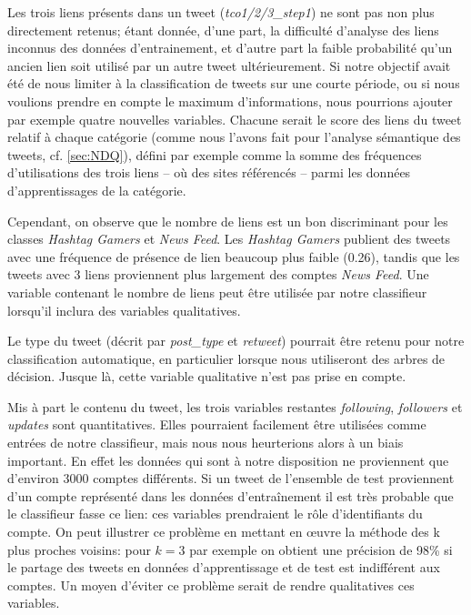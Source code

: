 \documentclass[twocolumn,10pt]{article}
\begin{document}
Les trois liens présents dans un tweet (\textit{tco1/2/3\_step1}) ne sont pas non plus directement retenus; étant donnée, d'une part, la difficulté d'analyse des liens inconnus des données d'entrainement, et d'autre part la faible probabilité qu'un ancien lien soit utilisé par un autre tweet ultérieurement. Si notre objectif avait été de nous limiter à la classification de tweets sur une courte période, ou si nous voulions prendre en compte le maximum d'informations, nous pourrions ajouter par exemple quatre nouvelles variables. Chacune serait le score des liens du tweet relatif à chaque catégorie (comme nous l'avons fait pour l'analyse sémantique des tweets, cf. \ref{sec:NDQ}), défini par exemple comme la somme des fréquences d'utilisations des trois liens -- où des sites référencés -- parmi les données d'apprentissages de la catégorie.

Cependant, on observe que le nombre de liens est un bon discriminant pour les classes \textit{Hashtag Gamers} et \textit{News Feed}. Les \textit{Hashtag Gamers} publient des tweets avec une fréquence de présence de lien beaucoup plus faible (0.26), tandis que les tweets avec 3 liens proviennent plus largement des comptes \textit{News Feed}. Une variable contenant le nombre de liens peut être utilisée par notre classifieur lorsqu'il inclura des variables qualitatives.

Le type du tweet (décrit par \textit{post\_type} et \textit{retweet}) pourrait être retenu pour notre classification automatique, en particulier lorsque nous utiliseront des arbres de décision. Jusque là, cette variable qualitative n'est pas prise en compte.

Mis à part le contenu du tweet, les trois variables restantes \textit{following}, \textit{followers} et \textit{updates} sont quantitatives. Elles pourraient facilement être utilisées comme entrées de notre classifieur, mais nous nous heurterions alors à un biais important. En effet les données qui sont à notre disposition ne proviennent que d'environ 3000 comptes différents. Si un tweet de l'ensemble de test proviennent d'un compte représenté dans les données d'entraînement il est très probable que le classifieur fasse ce lien: ces variables prendraient le rôle d'identifiants du compte. On peut illustrer ce problème en mettant en œuvre la méthode des k plus proches voisins: pour $k=3$ par exemple on obtient une précision de 98\% si le partage des tweets en données d'apprentissage et de test est indifférent aux comptes. Un moyen d'éviter ce problème serait de rendre qualitatives ces variables.
\end{document}
